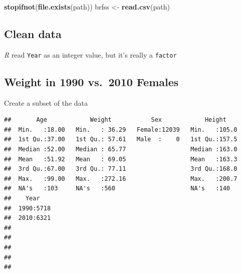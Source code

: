 \documentclass[]{article}
\newenvironment{Shaded}{\begin{snugshade}}{\end{snugshade}}
\newcommand{\KeywordTok}[1]{\textcolor[rgb]{0.13,0.29,0.53}{\textbf{#1}}}
\newcommand{\StringTok}[1]{\textcolor[rgb]{0.31,0.60,0.02}{#1}}
\newcommand{\OperatorTok}[1]{\textcolor[rgb]{0.81,0.36,0.00}{\textbf{#1}}}
\newcommand{\NormalTok}[1]{#1}
\theoremstyle{definition}
\theoremstyle{definition}
\theoremstyle{remark}
\begin{document}
\begin{Shaded}
\begin{Highlighting}[]
\KeywordTok{stopifnot}\NormalTok{(}\KeywordTok{file.exists}\NormalTok{(path))}
\NormalTok{brfss <-}\StringTok{ }\KeywordTok{read.csv}\NormalTok{(path)}
\end{Highlighting}
\end{Shaded}

\subsection{Clean data}\label{clean-data}

\emph{R} read \texttt{Year} as an integer value, but it's really a
\texttt{factor}

\begin{Shaded}
\end{Shaded}

\subsection{Weight in 1990 vs.~2010
Females}\label{weight-in-1990-vs.2010-females}

Create a subset of the data

\begin{Shaded}
\end{Shaded}

\begin{verbatim}
##       Age            Weight           Sex            Height     
##  Min.   :18.00   Min.   : 36.29   Female:12039   Min.   :105.0  
##  1st Qu.:37.00   1st Qu.: 57.61   Male  :    0   1st Qu.:157.5  
##  Median :52.00   Median : 65.77                  Median :163.0  
##  Mean   :51.92   Mean   : 69.05                  Mean   :163.3  
##  3rd Qu.:67.00   3rd Qu.: 77.11                  3rd Qu.:168.0  
##  Max.   :99.00   Max.   :272.16                  Max.   :200.7  
##  NA's   :103     NA's   :560                     NA's   :140    
##    Year     
##  1990:5718  
##  2010:6321  
##             
##             
##             
##             
## 
\end{verbatim}
\end{document}
